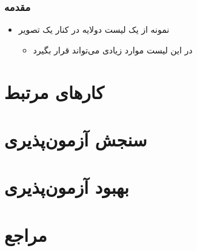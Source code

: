 \documentclass[xcolor=dvipsnames, 
professionalfonts, 
 xcolor={usenames, dvipsnames, svgnames, x11names},
11pt]{beamer}
\begin{document}
\begin{frame}
\frametitle{مقدمه}
\begin{itemize}\RTList
\item نمونه از یک لیست دولایه در کنار یک تصویر
\begin{itemize}[<1>]\RTList
 \item در این لیست موارد زیادی می‌تواند قرار بگیرد
 \end{itemize}
\end{itemize}
\end{frame}


\section{کارهای مرتبط}



\section{سنجش آزمون‌پذیری}


\section{بهبود آزمون‌پذیری}



\section{مراجع}
\begin{frame}
 {\scriptsize
 \begin{latin}

\end{latin}
}
\end{frame}

\end{document}
